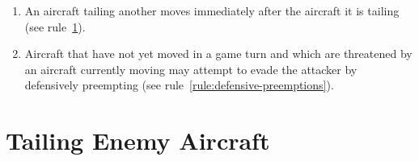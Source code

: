 {\begin{enumerate}
    \item{} An aircraft tailing another moves immediately after the aircraft it is tailing (see rule~\ref{rule:tailing-enemy-aircraft}).

    \item{} Aircraft that have not yet moved in a game turn and which are threatened by an aircraft currently moving may attempt to evade the attacker by defensively preempting (see rule~\ref{rule:defensive-preemptions}).
    
\end{enumerate}


}

\section{Tailing Enemy Aircraft}
\label{rule:tailing-enemy-aircraft}
\label{rule:tailing}

